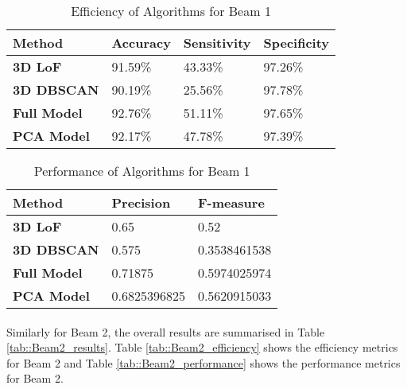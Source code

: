 \begin{table}[H]
	\centering
	\begin{tabular}{|l|l|l|l|}
		\hline
		\textbf{Method}     & \textbf{Accuracy} & \textbf{Sensitivity} & \textbf{Specificity} \\ \hline
		\textbf{3D LoF}     & 91.59\%           & 43.33\%              & 97.26\%              \\ \hline
		\textbf{3D DBSCAN}  & 90.19\%           & 25.56\%              & 97.78\%              \\ \hline
		\textbf{Full Model} & 92.76\%           & 51.11\%              & 97.65\%              \\ \hline
		\textbf{PCA Model}  & 92.17\%           & 47.78\%              & 97.39\%              \\ \hline
	\end{tabular}
\caption[Beam 1 Efficiency Metrics]{Efficiency of Algorithms for Beam 1}
\label{tab::Beam1_efficiency}
\end{table}

\begin{table}[H]
	\centering
	\begin{tabular}{|l|l|l|}
		\hline
		\textbf{Method}     & \textbf{Precision} & \textbf{F-measure} \\ \hline
		\textbf{3D LoF}     & 0.65               & 0.52               \\ \hline
		\textbf{3D DBSCAN}  & 0.575              & 0.3538461538       \\ \hline
		\textbf{Full Model} & 0.71875            & 0.5974025974       \\ \hline
		\textbf{PCA Model}  & 0.6825396825       & 0.5620915033       \\ \hline
	\end{tabular}
\caption[Beam 1 Performance Metrics]{Performance of Algorithms for Beam 1}
\label{tab::Beam1_performance}
\end{table}

\paragraph{ }Similarly for Beam 2, the overall results are summarised in Table \ref{tab::Beam2_results}. Table \ref{tab::Beam2_efficiency} shows the efficiency metrics for Beam 2 and Table \ref{tab::Beam2_performance} shows the performance metrics for Beam 2.


